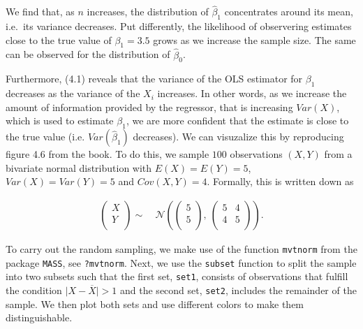 \documentclass[]{book}
\theoremstyle{definition}
\theoremstyle{definition}
\theoremstyle{definition}
\theoremstyle{remark}
\begin{document}
We find that, as \(n\) increases, the distribution of \(\hat\beta_1\)
concentrates around its mean, i.e.~its variance decreases. Put
differently, the likelihood of observering estimates close to the true
value of \(\beta_1 = 3.5\) grows as we increase the sample size. The
same can be observed for the distribution of \(\hat\beta_0\).

Furthermore, (4.1) reveals that the variance of the OLS estimator for
\(\beta_1\) decreases as the variance of the \(X_i\) increases. In other
words, as we increase the amount of information provided by the
regressor, that is increasing \(Var(X)\), which is used to estimate
\(\beta_1\), we are more confident that the estimate is close to the
true value (i.e. \(Var(\hat\beta_1)\) decreases). We can visuzalize this
by reproducing figure 4.6 from the book. To do this, we sample \(100\)
observations \((X,Y)\) from a bivariate normal distribution with
\(E(X)=E(Y)=5\), \(Var(X)=Var(Y)=5\) and \(Cov(X,Y)=4\). Formally, this
is written down as

\begin{align}
  \begin{pmatrix}
    X \\
    Y \\
  \end{pmatrix}
  \sim & \ \mathcal{N} 
  \left(
    \begin{pmatrix}
      5 \\
      5 \\
    \end{pmatrix}, \ 
    \begin{pmatrix}
      5 & 4 \\
      4 & 5 \\
    \end{pmatrix}
  \right). \tag{4.3}
\end{align}

To carry out the random sampling, we make use of the function
\texttt{mvtnorm} from the package \texttt{MASS}, see \texttt{?mvtnorm}.
Next, we use the \texttt{subset} function to split the sample into two
subsets such that the first set, \texttt{set1}, consists of observations
that fulfill the condition \(\lvert X - \overline{X} \rvert > 1\) and
the second set, \texttt{set2}, includes the remainder of the sample. We
then plot both sets and use different colors to make them
distinguishable.
\end{document}
